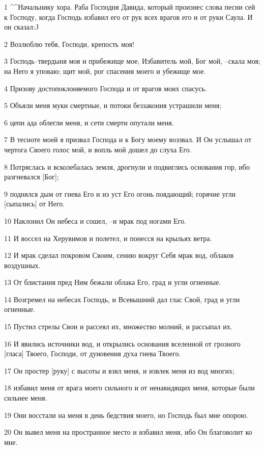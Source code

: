 \par 1 ^^Начальнику хора. Раба Господня Давида, который произнес слова песни сей к Господу, когда Господь избавил его от рук всех врагов его и от руки Саула. И он сказал:^^
\par 2 Возлюблю тебя, Господи, крепость моя!
\par 3 Господь--твердыня моя и прибежище мое, Избавитель мой, Бог мой, --скала моя; на Него я уповаю; щит мой, рог спасения моего и убежище мое.
\par 4 Призову достопоклоняемого Господа и от врагов моих спасусь.
\par 5 Объяли меня муки смертные, и потоки беззакония устрашили меня;
\par 6 цепи ада облегли меня, и сети смерти опутали меня.
\par 7 В тесноте моей я призвал Господа и к Богу моему воззвал. И Он услышал от чертога Своего голос мой, и вопль мой дошел до слуха Его.
\par 8 Потряслась и всколебалась земля, дрогнули и подвиглись основания гор, ибо разгневался [Бог];
\par 9 поднялся дым от гнева Его и из уст Его огонь поядающий; горячие угли [сыпались] от Него.
\par 10 Наклонил Он небеса и сошел, --и мрак под ногами Его.
\par 11 И воссел на Херувимов и полетел, и понесся на крыльях ветра.
\par 12 И мрак сделал покровом Своим, сению вокруг Себя мрак вод, облаков воздушных.
\par 13 От блистания пред Ним бежали облака Его, град и угли огненные.
\par 14 Возгремел на небесах Господь, и Всевышний дал глас Свой, град и угли огненные.
\par 15 Пустил стрелы Свои и рассеял их, множество молний, и рассыпал их.
\par 16 И явились источники вод, и открылись основания вселенной от грозного [гласа] Твоего, Господи, от дуновения духа гнева Твоего.
\par 17 Он простер [руку] с высоты и взял меня, и извлек меня из вод многих;
\par 18 избавил меня от врага моего сильного и от ненавидящих меня, которые были сильнее меня.
\par 19 Они восстали на меня в день бедствия моего, но Господь был мне опорою.
\par 20 Он вывел меня на пространное место и избавил меня, ибо Он благоволит ко мне.
